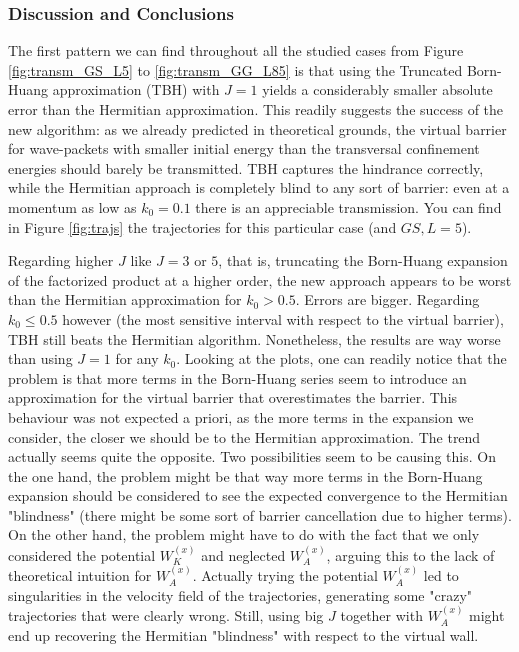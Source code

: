 \documentclass[11pt, a4paper]{article} %
\begin{document}
\subsubsection{Discussion and Conclusions}\vspace{-0.3cm}
The first pattern we can find throughout all the studied cases from Figure \ref{fig:transm_GS_L5} to \ref{fig:transm_GG_L85} is that using the Truncated Born-Huang approximation (TBH) with $J=1$ yields a considerably smaller absolute error than the Hermitian approximation. This readily suggests the success of the new algorithm: as we already predicted in theoretical grounds, the virtual barrier for wave-packets with smaller initial energy than the transversal confinement energies should barely be transmitted. TBH captures the hindrance correctly, while the Hermitian approach is completely blind to any sort of barrier: even at a momentum as low as $k_0=0.1$ there is an appreciable transmission. You can find in Figure \ref{fig:trajs} the trajectories for this particular case (and $GS, L=5$).

Regarding higher $J$ like $J=3$ or $5$, that is, truncating the Born-Huang expansion of the factorized product at a higher order, the new approach appears to be worst than the Hermitian approximation for $k_0>0.5$. Errors are bigger. Regarding $k_0\leq0.5$ however (the most sensitive interval with respect to the virtual barrier), TBH still beats the Hermitian algorithm. Nonetheless, the results are way worse than using $J=1$ for any $k_0$. Looking at the plots, one can readily notice that the problem is that more terms in the Born-Huang series seem to introduce an approximation for the virtual barrier that overestimates the barrier. This behaviour was not expected a priori, as the more terms in the expansion we consider, the closer we should be to the Hermitian approximation. The trend actually seems quite the opposite. Two possibilities seem to be causing this. On the one hand, the problem might be that way more terms in the Born-Huang expansion should be considered to see the expected convergence to the Hermitian "blindness" (there might be some sort of barrier cancellation due to higher terms). On the other hand, the problem might have to do with the fact that we only considered the potential $W_K^{(x)}$ and neglected $W_A^{(x)}$, arguing this to the lack of theoretical intuition for $W_A^{(x)}$. Actually trying the potential $W_A^{(x)}$ led to singularities in the velocity field of the trajectories, generating some "crazy" trajectories that were clearly wrong. Still, using big $J$ together with $W_A^{(x)}$ might end up recovering the Hermitian "blindness" with respect to the virtual wall.
\end{document}
